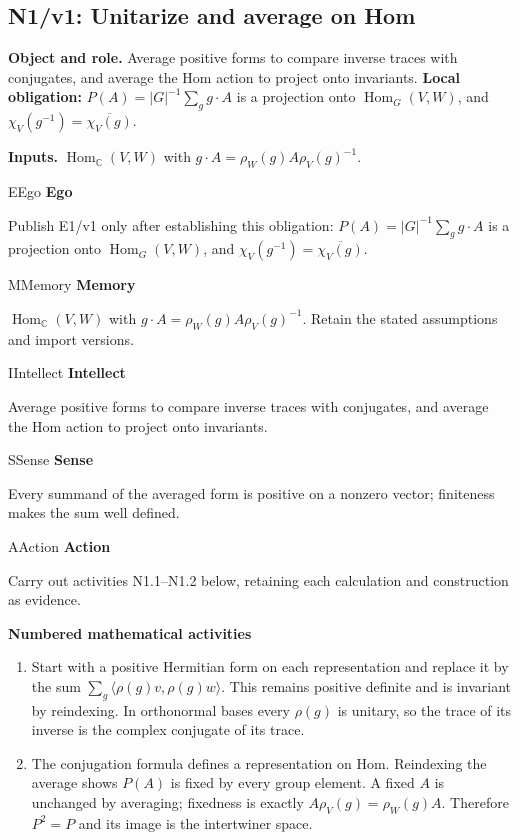 \documentclass[preprint,12pt,aps,pra,showkeys,amsmath,amssymb,superscriptaddress,floatfix]{revtex4-2}
\theoremstyle{definition}
\theoremstyle{remark}
\newcommand{\mmfaculty}[3]{%
 \begin{mmfacultybox}{#1}{#2}
 {\sffamily\bfseries\color{MMBlue}#2}\par\smallskip #3
 \end{mmfacultybox}}
\newcommand{\field}[2]{\par\smallskip\noindent\textbf{#1.} #2\par}
\begin{document}
\subsection{N1/v1: Unitarize and average on Hom}

\field{Object and role}{Average positive forms to compare inverse traces with conjugates, and
average the Hom action to project onto invariants. \textbf{Local
obligation:} \(P(A)=|G|^{-1}\sum_g g\cdot A\) is a projection onto
\(\operatorname{Hom}_G(V,W)\), and
\(\chi_V(g^{-1})=\overline{\chi_V(g)}\).}

\field{Inputs}{\(\operatorname{Hom}_{\mathbb C}(V,W)\) with
\(g\cdot A=\rho_W(g)A\rho_V(g)^{-1}\).}

\mmfaculty{E}{Ego}{Publish E1/v1 only after establishing this obligation:
\(P(A)=|G|^{-1}\sum_g g\cdot A\) is a projection onto
\(\operatorname{Hom}_G(V,W)\), and
\(\chi_V(g^{-1})=\overline{\chi_V(g)}\).}

\mmfaculty{M}{Memory}{\(\operatorname{Hom}_{\mathbb C}(V,W)\) with
\(g\cdot A=\rho_W(g)A\rho_V(g)^{-1}\). Retain the stated assumptions and
import versions.}

\mmfaculty{I}{Intellect}{Average positive forms to compare inverse traces with conjugates, and
average the Hom action to project onto invariants.}

\mmfaculty{S}{Sense}{Every summand of the averaged form is positive on a nonzero vector;
finiteness makes the sum well defined.}

\mmfaculty{A}{Action}{Carry out activities N1.1--N1.2 below, retaining each calculation and
construction as evidence.}

\smallskip\noindent\textbf{Numbered mathematical activities}

\begin{enumerate}[label=N1.\arabic*,leftmargin=3.4em]

\item Start with a positive Hermitian form on each representation and replace
it by the sum \(\sum_g\langle\rho(g)v,\rho(g)w\rangle\). This remains
positive definite and is invariant by reindexing. In orthonormal bases
every \(\rho(g)\) is unitary, so the trace of its inverse is the complex
conjugate of its trace.

\item The conjugation formula defines a representation on Hom. Reindexing the
average shows \(P(A)\) is fixed by every group element. A fixed \(A\) is
unchanged by averaging; fixedness is exactly \(A\rho_V(g)=\rho_W(g)A\).
Therefore \(P^2=P\) and its image is the intertwiner space.

\end{enumerate}
\end{document}
